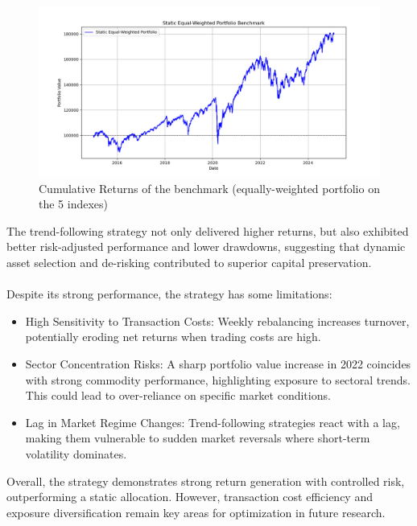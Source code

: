 \documentclass[11pt, oneside, a4paper, titlepage]{report}
\begin{document}
\begin{figure}[H]
    \centering
    \includegraphics[width=1.2\textwidth]{asset_trend_benchmark.png}
    \caption{Cumulative Returns of the benchmark (equally-weighted portfolio on the 5 indexes)}
\end{figure}


The trend-following strategy not only delivered higher returns, but also exhibited better risk-adjusted performance and lower drawdowns, suggesting that dynamic asset selection and de-risking contributed to superior capital preservation.
\\
\\
Despite its strong performance, the strategy has some limitations:

\begin{itemize}
    \item High Sensitivity to Transaction Costs: Weekly rebalancing increases turnover, potentially eroding net returns when trading costs are high.
    \item Sector Concentration Risks: A sharp portfolio value increase in 2022 coincides with strong commodity performance, highlighting exposure to sectoral trends. This could lead to over-reliance on specific market conditions.
    \item Lag in Market Regime Changes: Trend-following strategies react with a lag, making them vulnerable to sudden market reversals where short-term volatility dominates.
\end{itemize}

Overall, the strategy demonstrates strong return generation with controlled risk, outperforming a static allocation. However, transaction cost efficiency and exposure diversification remain key areas for optimization in future research.
\end{document}
